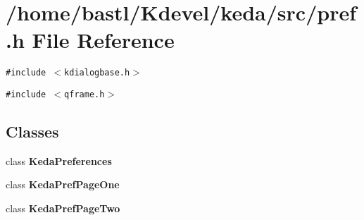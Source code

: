 \section{/home/bastl/Kdevel/keda/src/pref.h File Reference}
\label{src_2pref_8h}
{\tt \#include $<$kdialogbase.h$>$}\par
{\tt \#include $<$qframe.h$>$}\par
\subsection*{Classes}
\begin{CompactItemize}
\item 
class {\bf Keda\-Preferences}
\item 
class {\bf Keda\-Pref\-Page\-One}
\item 
class {\bf Keda\-Pref\-Page\-Two}
\end{CompactItemize}
